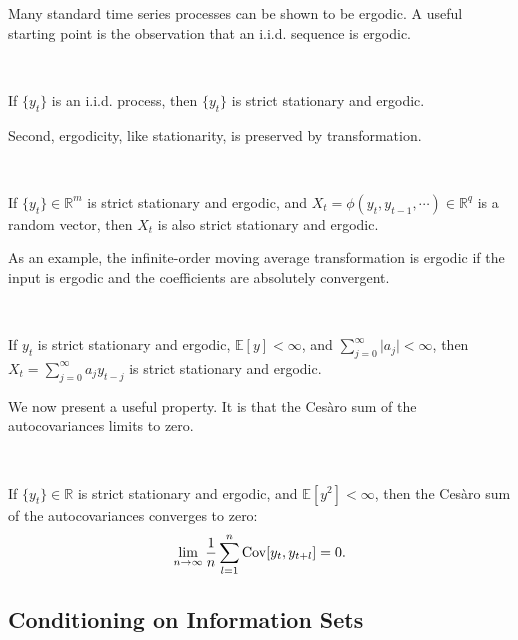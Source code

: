 Many standard time series processes can be shown to be ergodic.
A useful starting point is the observation that an i.i.d. sequence is ergodic. 

\begin{theorem}\label{thm:iid-ergodic}
    \

    If $\{y_t\}$ is an i.i.d. process, then $\{y_t\}$ is strict stationary and ergodic.    
\end{theorem}

Second, ergodicity, like stationarity, is preserved by transformation.
\begin{theorem}\label{thm:ergodicity-transformation-invariance}
    \

    If $\{y_t\} \in \mathbb{R}^m$ is strict stationary and ergodic,
    and $X_t = \phi (y_t, y_{t-1}, \cdots) \in \mathbb{R}^q$ is a random vector,
    then $X_t$ is also strict stationary and ergodic.
\end{theorem}

As an example, the infinite-order moving average transformation is ergodic
if the input is ergodic and the coefficients are absolutely convergent.

\begin{theorem}
    \

    If $y_t$ is strict stationary and ergodic, $\mathbb{E}[y] < \infty$,
    and $\sum_{j=0}^{\infty} \vert a_j \vert < \infty$,
    then $X_t = \sum_{j=0}^{\infty} a_j y_{t-j}$ is strict stationary and ergodic.    
\end{theorem}

We now present a useful property. It is that the Cesàro sum of the autocovariances limits to zero.

\begin{theorem}\label{thm:cesaro-sum-autocovariances}
    \

    If $\{y_t\} \in \mathbb{R}$ is strict stationary and ergodic, and $\mathbb{E}[y^2] < \infty$,
    then the Cesàro sum of the autocovariances converges to zero:
    \begin{gather*}
        \lim_{n \to \infty} \frac{1}{n} \sum_{l=1}^{n} \Cov[y_t, y_{t+l}] = 0.
    \end{gather*}    
\end{theorem}

\subsection{Conditioning on Information Sets}

